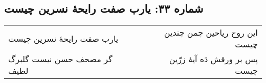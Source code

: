 \begin{center}
\section*{شماره ۳۳: یارب صفت رایحۀ نسرین چیست}
\label{sec:033}
\begin{longtable}{l p{0.5cm} r}
یارب صفت رایحهٔ نسرین چیست
&&
این روح ریاحین چمن چندین چیست
\\
گر مصحف حسن نیست گلبرگ لطیف
&&
پس بر ورقش دَه آیهٔ زرّین چیست
\\
\end{longtable}
\end{center}
